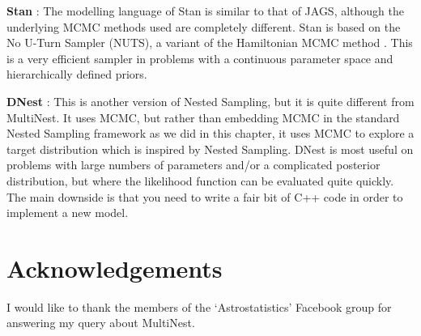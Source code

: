 {\bf Stan} \citep{stan}: The modelling language of Stan is similar to that of
JAGS, although the underlying MCMC methods used are completely different. Stan
is based on the No U-Turn Sampler (NUTS), a variant of the Hamiltonian MCMC
method \citep{hamiltonian}. This is a very efficient sampler in problems with
a continuous parameter space and hierarchically defined priors.

{\bf DNest} \citep{dnest}: This is another version of Nested Sampling, but it
is quite different from MultiNest. It uses MCMC, but rather than embedding
MCMC in the standard Nested Sampling framework as we did in this chapter, it
uses MCMC to explore a target distribution which is inspired by Nested Sampling.
DNest is most useful on problems with large numbers of parameters and/or a
complicated posterior distribution, but where the
likelihood function can be evaluated quite quickly. The main downside is that
you need to write a fair bit of C++ code in order to implement a new model.

\section{Acknowledgements}
I would like to thank the members of the `Astrostatistics' Facebook group for
answering my query about MultiNest.

